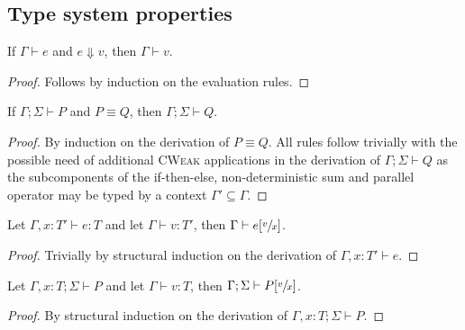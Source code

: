 \subsection{Type system properties}

\begin{theorem}\label{thm:eval_typing}
  If $\Gamma \vdash e$ and $e \Downarrow v$, then $\Gamma \vdash v$.
\end{theorem}
\begin{proof}
  Follows by induction on the evaluation rules.
\end{proof}

\begin{theorem}
  If $\Gamma; \Sigma \vdash P$ and $P \equiv Q$, then $\Gamma; \Sigma \vdash Q$.
\end{theorem}
\begin{proof}
  By induction on the derivation of $P \equiv Q$. All rules follow trivially with the possible need of additional \textsc{CWeak} applications in the derivation
  of $\Gamma; \Sigma \vdash Q$ as the subcomponents of the if-then-else, non-deterministic sum and parallel operator may be typed by a context $\Gamma' \subseteq \Gamma$.
\end{proof}


\begin{lemma}
  Let $\Gamma, x : T' \vdash e : T$ and let $\Gamma \vdash v : T'$, then $\Gamma \vdash e[\sfrac{v}{x}]$.
\end{lemma}
\begin{proof}
  Trivially by structural induction on the derivation of $\Gamma, x : T' \vdash e$.
\end{proof}

\begin{theorem}
  Let $\Gamma, x : T; \Sigma \vdash P$ and let $\Gamma \vdash v : T$, then $\Gamma; \Sigma \vdash P[\sfrac{v}{x}]$.
\end{theorem}
\begin{proof}
  By structural induction on the derivation of $\Gamma, x : T; \Sigma \vdash P$.
\end{proof}


